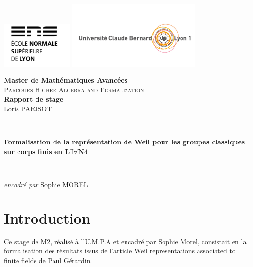 \documentclass[10pt]{article}
\theoremstyle{definition}
\begin{document}
	\thispagestyle{empty} 
	
	\includegraphics[width=0.27\textwidth]{figure/logo.png} 
	\hfill
	\includegraphics[width=0.5\textwidth]{figure/logo_lyon11.png}\par\vspace{1cm}
	\begin{center}
	\Large \textbf{Master de Mathématiques Avancées}\normalsize \\
	\textsc{Parcours Higher Algebra and Formalization}\\ \vspace{8\baselineskip}
	\Huge \textbf{Rapport de stage} \normalsize \\ \vspace{0.9\baselineskip}
	\Large Loris PARISOT \normalsize\\ \vspace{2\baselineskip}
	\rule{0.95\textwidth}{2pt}\vspace{0.9\baselineskip}\\
	\LARGE \textbf{Formalisation de la représentation de Weil pour les groupes classiques sur corps finis en $\mathbf{L\exists\forall N}4$}\vspace{0.5\baselineskip}\normalsize\\
	\rule{0.95\textwidth}{2pt}\\
	\Large \textit{encadré par} Sophie MOREL
	\end{center}
	\vspace{10cm}
	\newpage
	\section*{Introduction}
	Ce stage de M2, réalisé à l'U.M.P.A et encadré par Sophie Morel, consistait en la formalisation des résultats issus de l'article \og Weil representations associated to finite fields \fg de Paul Gérardin. 
	\newline
	
\end{document}
